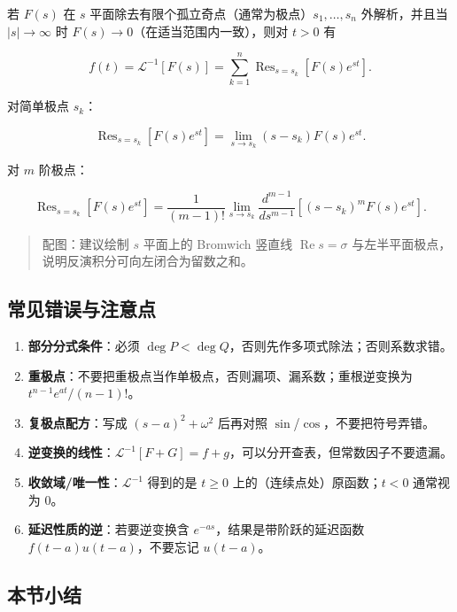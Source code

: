 若 \(F(s)\) 在 \(s\)
平面除去有限个孤立奇点（通常为极点）\(s_1,\ldots,s_n\) 外解析，并且当
\(|s|\to\infty\) 时 \(F(s)\to 0\)（在适当范围内一致），则对 \(t>0\) 有

\[
f(t)=\mathcal{L}^{-1}[F(s)]=\sum_{k=1}^{n}\operatorname{Res}_{s=s_k}\left[F(s)e^{st}\right].
\]

对简单极点 \(s_k\)：

\[
\operatorname{Res}_{s=s_k}[F(s)e^{st}]=\lim_{s\to s_k}(s-s_k)F(s)e^{st}.
\]

对 \(m\) 阶极点：

\[
\operatorname{Res}_{s=s_k}[F(s)e^{st}]=\frac{1}{(m-1)!}\lim_{s\to s_k}\frac{d^{m-1}}{ds^{m-1}}\left[(s-s_k)^m F(s)e^{st}\right].
\]

\begin{quote}
配图：建议绘制 \(s\) 平面上的 Bromwich 竖直线
\(\operatorname{Re}s=\sigma\)
与左半平面极点，说明反演积分可向左闭合为留数之和。
\end{quote}

\subsection{常见错误与注意点}\label{ux5e38ux89c1ux9519ux8befux4e0eux6ce8ux610fux70b9-23}

\begin{enumerate}
\def\labelenumi{\arabic{enumi}.}
\tightlist
\item
  \textbf{部分分式条件}：必须
  \(\deg P<\deg Q\)，否则先作多项式除法；否则系数求错。
\item
  \textbf{重极点}：不要把重极点当作单极点，否则漏项、漏系数；重根逆变换为
  \(t^{n-1}e^{at}/(n-1)!\)。
\item
  \textbf{复极点配方}：写成 \((s-a)^2+\omega^2\) 后再对照
  \(\sin\)/\(\cos\)，不要把符号弄错。
\item
  \textbf{逆变换的线性}：\(\mathcal{L}^{-1}[F+G]=f+g\)，可以分开查表，但常数因子不要遗漏。
\item
  \textbf{收敛域/唯一性}：\(\mathcal{L}^{-1}\) 得到的是 \(t\ge 0\)
  上的（连续点处）原函数；\(t<0\) 通常视为 \(0\)。
\item
  \textbf{延迟性质的逆}：若要逆变换含
  \(e^{-as}\)，结果是带阶跃的延迟函数 \(f(t-a)u(t-a)\)，不要忘记
  \(u(t-a)\)。
\end{enumerate}

\subsection{本节小结}\label{ux672cux8282ux5c0fux7ed3-23}

